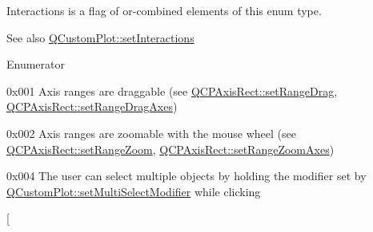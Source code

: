 {\ttfamily Interactions} is a flag of or-\/combined elements of this enum type.

\begin{DoxySeeAlso}{See also}
\hyperlink{class_q_custom_plot_a5ee1e2f6ae27419deca53e75907c27e5}{Q\+Custom\+Plot\+::set\+Interactions} 
\end{DoxySeeAlso}
\begin{Desc}
\item[Enumerator]\par
\begin{description}
\item[{\em 
\hypertarget{namespace_q_c_p_a2ad6bb6281c7c2d593d4277b44c2b037a2c4432b9aceafb94000be8d1b589ef18}{}i\+Range\+Drag\label{namespace_q_c_p_a2ad6bb6281c7c2d593d4277b44c2b037a2c4432b9aceafb94000be8d1b589ef18}
}]{\ttfamily 0x001} Axis ranges are draggable (see \hyperlink{class_q_c_p_axis_rect_ae6aef2f7211ba6097c925dcd26008418}{Q\+C\+P\+Axis\+Rect\+::set\+Range\+Drag}, \hyperlink{class_q_c_p_axis_rect_a648cce336bd99daac4a5ca3e5743775d}{Q\+C\+P\+Axis\+Rect\+::set\+Range\+Drag\+Axes}) \item[{\em 
\hypertarget{namespace_q_c_p_a2ad6bb6281c7c2d593d4277b44c2b037abee1e94353525a636aeaf0ba32b72e14}{}i\+Range\+Zoom\label{namespace_q_c_p_a2ad6bb6281c7c2d593d4277b44c2b037abee1e94353525a636aeaf0ba32b72e14}
}]{\ttfamily 0x002} Axis ranges are zoomable with the mouse wheel (see \hyperlink{class_q_c_p_axis_rect_a7960a9d222f1c31d558b064b60f86a31}{Q\+C\+P\+Axis\+Rect\+::set\+Range\+Zoom}, \hyperlink{class_q_c_p_axis_rect_a9442cca2aa358405f39a64d51eca13d2}{Q\+C\+P\+Axis\+Rect\+::set\+Range\+Zoom\+Axes}) \item[{\em 
\hypertarget{namespace_q_c_p_a2ad6bb6281c7c2d593d4277b44c2b037aef673112c5067c3cf4cfddb62da7265d}{}i\+Multi\+Select\label{namespace_q_c_p_a2ad6bb6281c7c2d593d4277b44c2b037aef673112c5067c3cf4cfddb62da7265d}
}]{\ttfamily 0x004} The user can select multiple objects by holding the modifier set by \hyperlink{class_q_custom_plot_a8fc96e3b5138a06759a2a90c166df516}{Q\+Custom\+Plot\+::set\+Multi\+Select\+Modifier} while clicking \item[{\em 
}
\end{description}
\end{Desc}
